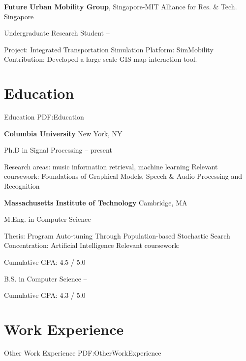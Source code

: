 \documentclass[a4paper,10pt,oneside]{article}
\begin{document}
\begin{body}
\SmallEntryGap

\textbf{Future Urban Mobility Group}, Singapore-MIT Alliance for Res. \& Tech.
\hfill Singapore
\par
Undergraduate Research Student
\hfill
{} --
\begin{detail}
\BulletItem
Project:
Integrated Transportation Simulation Platform: SimMobility
\BulletItem
Contribution: Developed a large-scale GIS map interaction tool.
\end{detail}



\section
{Education}
{Education}
{PDF:Education}

\textbf{Columbia University}
\hfill New York, NY
\par
Ph.D in Signal Processing 
\hfill
{} --
present
\begin{detail}
\BulletItem
Research areas:
music information retrieval, machine learning
\BulletItem
Relevant coursework:
Foundations of Graphical Models, Speech \& Audio Processing and Recognition
\end{detail}
\SmallEntryGap

\textbf{Massachusetts Institute of Technology}
\hfill Cambridge, MA
\par
M.Eng. in
Computer Science
\hfill
{} --
\begin{detail}
\BulletItem
Thesis:
Program Auto-tuning Through Population-based Stochastic Search
\BulletItem
Concentration: Artificial Intelligence
\BulletItem
Relevant coursework: 

\BulletItem
Cumulative GPA: 4.5 / 5.0
\end{detail}

B.S. in Computer Science
\hfill
{} --
\begin{detail}
\BulletItem
Cumulative GPA: 4.3 / 5.0
\end{detail}

%
\section
{Work Experience}
{Other Work Experience}
{PDF:OtherWorkExperience}


\end{body}
\end{document}

